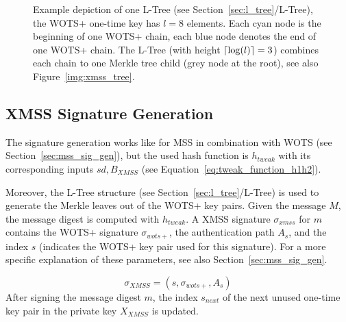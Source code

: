 \begin{figure}
\caption{Example depiction of one L-Tree (see Section~\ref{sec:l_tree}/L-Tree), the WOTS+ one-time key has $l=8$ elements. Each \textcolor{cyan_tud}{cyan node} is the beginning of one WOTS+ chain, each \textcolor{darkblue_tud}{blue node} denotes the end of one WOTS+ chain. The L-Tree (with height $\lceil\log(l)\rceil=3$) combines each chain to one Merkle tree child (\textcolor{grey_tud}{grey node} at the root), see also Figure~\ref{img:xmss_tree}.
} 
\label{img:l_tree}
\end{figure}

\subsection{XMSS Signature Generation}
The signature generation works like for MSS in combination with WOTS (see Section~\ref{sec:mss_sig_gen}), but the used hash function is $h_{tweak}$ with its corresponding inputs $sd, B_{XMSS}$ (see Equation~\ref{eq:tweak_function_h1h2}).

Moreover, the L-Tree structure (see Section~\ref{sec:l_tree}/L-Tree) is used to generate the Merkle leaves out of the WOTS+ key pairs.
Given the message $M$, the message digest is computed with $h_{tweak}$. 
A XMSS signature $\sigma_{xmss}$ for $m$ contains the WOTS+ signature $\sigma_{wots+}$, the authentication path $A_s$, and the index $s$ (indicates the WOTS+ key pair used for this signature). For a more specific explanation of these parameters, see also Section~\ref{sec:mss_sig_gen}.

\begin{equation}
\label{eq:xmss_sign}
\sigma_{XMSS} = (s, \sigma_{wots+}, A_s) 
\end{equation}
After signing the message digest $m$, the index $s_{next}$ of the next unused one-time key pair in the private key $X_{XMSS}$ is updated.

